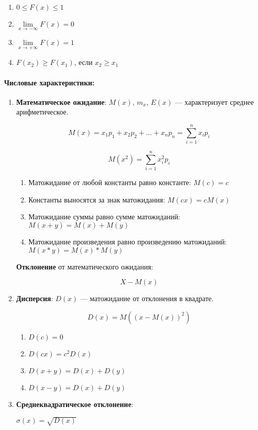 \documentclass{article}
\begin{document}
\begin{multicols}{2}
\begin{enumerate}
    \item $0 \le F(x) \le 1$
    \item $\lim\limits_{x \to -\infty} F(x) = 0$
    \item $\lim\limits_{x \to +\infty} F(x) = 1$
    \item $F(x_2) \ge F(x_1)$, если $x_2 \ge x_1$
\end{enumerate}
\end{multicols}

\paragraph{Числовые характеристики:}

\begin{enumerate}
    \item \textbf{Математическое ожидание}: $M(x)$, $m_x$, $E(x)$ — характеризует среднее арифметическое.
    
    $$M(x) = x_1p_1 + x_2 p_2 + \dots + x_{n} p_{n} = \sum\limits_{i = 1}^{n} x_{i} p_{i}$$

    $$M(x^2) = \sum\limits_{i = 1}^{n} x_{i}^2 p_{i}$$

    \begin{enumerate}
        \item Матожидание от любой константы равно константе: $M(c) = c$
        \item Константы выносятся за знак матожидания: $M(cx) = c M(x)$
        \item Матожидание суммы равно сумме матожиданий: $M(x + y) = M(x) + M(y)$
        \item Матожидание произведения равно произведению матожиданий: $M(x * y) = M(x) * M(y)$
    \end{enumerate}

    \textbf{Отклонение} от математического ожидания:

    $$X - M(x)$$
    \item \textbf{Дисперсия}: $D(x)$ — матожидание от отклонения в квадрате.
    
    $$D(x) = M((x - M(x))^2)$$

    \begin{multicols}{2}
    \begin{enumerate}
        \item $D(c) = 0$
        \item $D(cx) = c^2 D(x)$
        \item $D(x + y) = D(x) + D(y)$
        \item $D(x - y) = D(x) + D(y)$
    \end{enumerate}
    \end{multicols}
    \item \textbf{Среднеквадратическое отклонение}:
    
    $\sigma(x) = \sqrt{D(x)}$
\end{enumerate}
\end{document}
